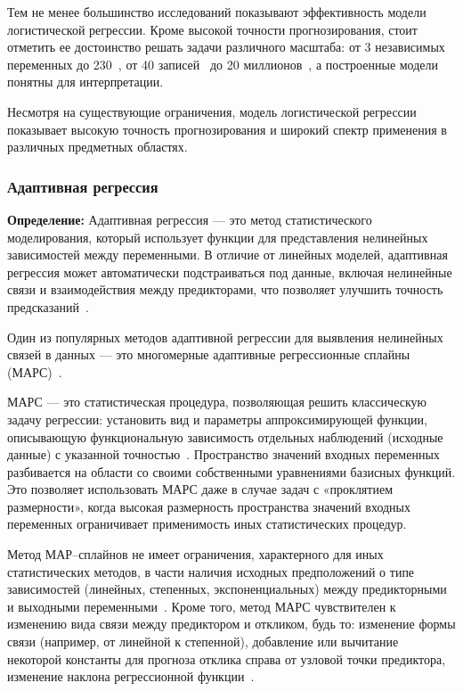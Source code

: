 Тем не менее большинство исследований показывают эффективность модели логистической регрессии.
Кроме высокой точности прогнозирования, стоит отметить ее достоинство решать задачи различного масштаба: от 3 независимых~\cite{simonova} переменных до 230~\cite{osikov}, от 40 записей~\cite{bogdanov} до 20 миллионов~\cite{seredniy}, а построенные модели понятны для интерпретации.

Несмотря на существующие ограничения, модель логистической регрессии показывает высокую точность прогнозирования и широкий спектр применения в различных предметных областях.


\subsubsection{Адаптивная регрессия}

\textbf{ Определение:} Адаптивная регрессия --- это метод статистического моделирования, который использует функции для представления нелинейных зависимостей между переменными.
В отличие от линейных моделей, адаптивная регрессия может автоматически подстраиваться под данные, включая нелинейные связи и взаимодействия между предикторами, что позволяет улучшить точность предсказаний~\cite{friedman2}.

Один из популярных методов адаптивной регрессии для выявления нелинейных связей в данных --- это многомерные адаптивные регрессионные сплайны (МАРС)~\cite{friedman2}.

МАРС --- это статистическая процедура, позволяющая решить классическую задачу регрессии: установить вид и параметры аппроксимирующей функции, описывающую функциональную зависимость отдельных наблюдений (исходные данные) с указанной точностью~\cite{romanova}.
Пространство значений входных переменных разбивается на области со своими собственными уравнениями базисных функций.
Это позволяет использовать МАРС даже в случае задач с «проклятием размерности», когда высокая размерность пространства значений входных переменных ограничивает применимость иных статистических процедур.

Метод МАР--сплайнов не имеет ограничения, характерного для иных статистических методов, в части наличия исходных предположений о типе зависимостей (линейных, степенных, экспоненциальных) между предикторными и выходными переменными~\cite{romanova}.
Кроме того, метод МАРС чувствителен к изменению вида связи между предиктором и откликом, будь то: изменение формы связи (например, от линейной к степенной), добавление или вычитание некоторой константы для прогноза отклика справа от узловой точки предиктора, изменение наклона регрессионной функции~\cite{romanova}.

